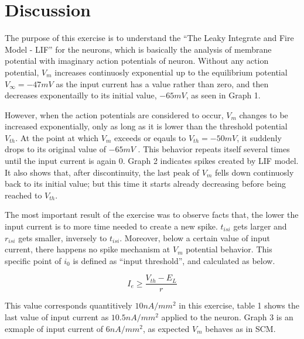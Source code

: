 \documentclass{article}
\begin{document}
\section*{Discussion}

The purpose of this exercise is to understand the ``The Leaky Integrate and Fire Model - LIF'' for the neurons, which is basically the analysis of membrane potential with imaginary action potentials of neuron. Without any action potential, $V_{m}$ increases continuosly exponential up to the equilibrium potential $V_{\infty}=-47 mV$ as the input current has a value rather than zero, and then decreases exponentailly to its initial value, $-65 mV$, as seen in Graph 1. 

However, when the action potentials are considered to occur, $V_{m}$ changes to be increased exponentially, only as long as it is lower than the threshold potential $V_{th}$. At the point at which $V_{m}$ exceeds or eqauls to $V_{th}=-50 mV$, it suddenly drops to its original value of $-65 mV$ . This behavior repeats itself several times until the input current is again 0. Graph 2 indicates spikes created by LIF model. It also shows that, after discontinuity, the last peak  of $V_{m}$ fells down continuosly back to its initial value; but this time it starts already decreasing before being reached to $V_{th}$.

The most important result of the exercise was to observe facts that, the lower the input current is to more time needed to create a new spike. $t_{isi}$ gets larger and $r_{isi}$ gets smaller, inversely to $t_{isi}$. Moreover, below a certain value of input current, there happens no spike mechanism at $V_{m}$ potential behavior. This specific point of $i_{0}$ is defined as ``input threshold'', and calculated as below. 

\begin{equation}
I_{e} \geq  \dfrac{V_{th}-E_{L}}{r}
\end{equation}

This value corresponds quantitively $10 nA/mm^{2}$ in this exercise, table 1 shows the last value of input current as $10.5 nA/mm^{2}$ applied to the neuron. Graph 3 is an exmaple of input current of $6 nA/mm^{2}$, as expected $V_{m}$ behaves as in SCM. 
\end{document}
